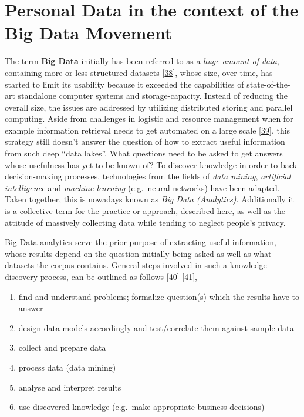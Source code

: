 \documentclass[12pt,english,a4paper,titlepage,cleardoublepage=empty,dottedtoc]{report}
\providecommand{\tightlist}{%
  \setlength{\itemsep}{0pt}\setlength{\parskip}{0pt}}
\begin{document}
\hypertarget{personal-data-in-the-context-of-the-big-data-movement}{\section{Personal
Data in the context of the Big Data
Movement}\label{personal-data-in-the-context-of-the-big-data-movement}}

The term \textbf{\protect\hypertarget{def--big-data}{}{Big Data}}
initially has been referred to as a \emph{huge amount of data},
containing more or less structured datasets
{[}\protect\hyperlink{ref-web_2016_oxford_definition_big-data}{38}{]},
whose size, over time, has started to limit its usability because it
exceeded the capabilities of state-of-the-art standalone computer
systems and storage-capacity. Instead of reducing the overall size, the
issues are addressed by utilizing distributed storing and parallel
computing. Aside from challenges in logistic and resource management
when for example information retrieval needs to get automated on a large
scale
{[}\protect\hyperlink{ref-web_2016_wikipedia_definition_big-data}{39}{]},
this strategy still doesn't answer the question of how to extract useful
information from such deep ``data lakes''. What questions need to be
asked to get answers whose usefulness has yet to be known of? To
discover knowledge in order to back decision-making processes,
technologies from the fields of \emph{data mining}, \emph{artificial
intelligence} and \emph{machine learning} (e.g.~neural networks) have
been adapted. Taken together, this is nowadays known as \emph{Big Data
(Analytics)}. Additionally it is a collective term for the practice or
approach, described here, as well as the attitude of massively
collecting data while tending to neglect people's privacy.

Big Data analytics serve the prior purpose of extracting useful
information, whose results depend on the question initially being asked
as well as what datasets the corpus contains. General steps involved in
such a knowledge discovery process, can be outlined as follows
{[}\protect\hyperlink{ref-chapter_2007_the-knowledge-discovery-process}{40}{]}
{[}\protect\hyperlink{ref-paper_2009_a-data-mining-knowledge-discovery-process-model}{41}{]},

\begin{enumerate}
\def\labelenumi{\arabic{enumi}.}
\tightlist
\item
  find and understand problems; formalize question(s) which the results
  have to answer
\item
  design data models accordingly and test/correlate them against sample
  data
\item
  collect and prepare data
\item
  process data (data mining)
\item
  analyse and interpret results
\item
  use discovered knowledge (e.g.~make appropriate business decisions)
\end{enumerate}
\end{document}
